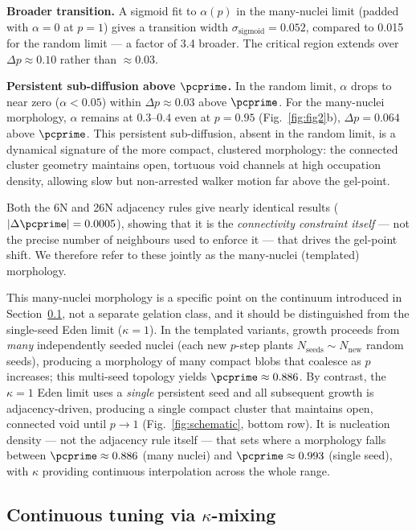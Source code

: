 \textbf{Broader transition.} A sigmoid fit to $\alpha(p)$ in the many-nuclei limit (padded with $\alpha = 0$ at $p = 1$) gives a transition width $\sigma_\mathrm{sigmoid} = 0.052$, compared to 0.015 for the random limit — a factor of 3.4 broader. The critical region extends over $\Delta p \approx 0.10$ rather than $\approx 0.03$.

\textbf{Persistent sub-diffusion above $\pcprime$.} In the random limit, $\alpha$ drops to near zero ($\alpha < 0.05$) within $\Delta p \approx 0.03$ above $\pcprime$. For the many-nuclei morphology, $\alpha$ remains at $0.3$--$0.4$ even at $p = 0.95$ (Fig.~\ref{fig:fig2}b), $\Delta p = 0.064$ above $\pcprime$. This persistent sub-diffusion, absent in the random limit, is a dynamical signature of the more compact, clustered morphology: the connected cluster geometry maintains open, tortuous void channels at high occupation density, allowing slow but non-arrested walker motion far above the gel-point.

Both the 6N and 26N adjacency rules give nearly identical results ($|\Delta\pcprime| = 0.0005$), showing that it is the \emph{connectivity constraint itself} — not the precise number of neighbours used to enforce it — that drives the gel-point shift. We therefore refer to these jointly as the many-nuclei (templated) morphology.

This many-nuclei morphology is a specific point on the continuum introduced in Section~\ref{sec:results_kappa}, not a separate gelation class, and it should be distinguished from the single-seed Eden limit ($\kappa = 1$). In the templated variants, growth proceeds from \emph{many} independently seeded nuclei (each new $p$-step plants $N_\mathrm{seeds} \sim N_\mathrm{new}$ random seeds), producing a morphology of many compact blobs that coalesce as $p$ increases; this multi-seed topology yields $\pcprime \approx 0.886$. By contrast, the $\kappa = 1$ Eden limit uses a \emph{single} persistent seed and all subsequent growth is adjacency-driven, producing a single compact cluster that maintains open, connected void until $p \to 1$ (Fig.~\ref{fig:schematic}, bottom row). It is nucleation density — not the adjacency rule itself — that sets where a morphology falls between $\pcprime \approx 0.886$ (many nuclei) and $\pcprime \approx 0.993$ (single seed), with $\kappa$ providing continuous interpolation across the whole range.

\subsection{Continuous tuning via $\kappa$-mixing}
\label{sec:results_kappa}

